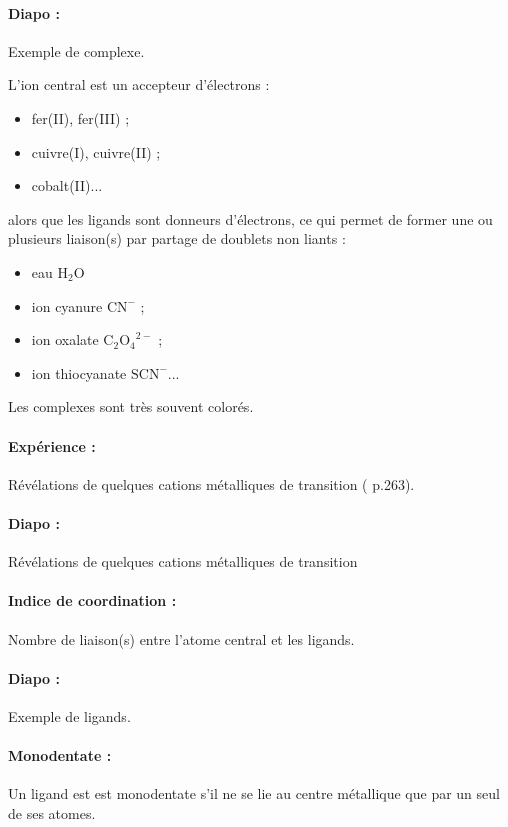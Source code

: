 \paragraph{Diapo :} Exemple de complexe.

L'ion central est un accepteur d'électrons :
\begin{itemize}
\item fer(II), fer(III) ;
\item cuivre(I), cuivre(II) ;
\item cobalt(II)...
\end{itemize}
alors que les ligands sont donneurs d'électrons, ce qui permet de former une ou plusieurs liaison(s) par partage de doublets non liants :
\begin{itemize}
\item eau $\mathrm{H_2O}$
\item ion cyanure $\mathrm{CN}^-$ ;
\item ion oxalate $\mathrm{C_2O_4}^{2-}$ ;
\item ion thiocyanate $\mathrm{SCN^-}$...
\end{itemize}
Les complexes sont très souvent colorés.

\paragraph{Expérience :} Révélations de quelques cations métalliques de transition (\cite{Buchere2017} p.263).

\paragraph{Diapo :} Révélations de quelques cations métalliques de transition

\paragraph{Indice de coordination : } Nombre de liaison(s) entre l'atome central et les ligands.

\paragraph{Diapo :} Exemple de ligands.

\paragraph{Monodentate :} Un ligand est est monodentate s'il ne se lie au centre métallique que par un seul de ses atomes.
